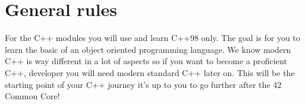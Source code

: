 

\chapter{General rules}

  For the C++ modules you will use and learn C++98 only.
  The goal is for you to learn the basic of an object oriented programming language.
  We know modern C++ is way different in a lot of aspects so if you want to become a proficient C++,
  developer you will need modern standard C++ later on.
  This will be the starting point of your C++ journey it's up to you to go further after the 42 Common Core!


